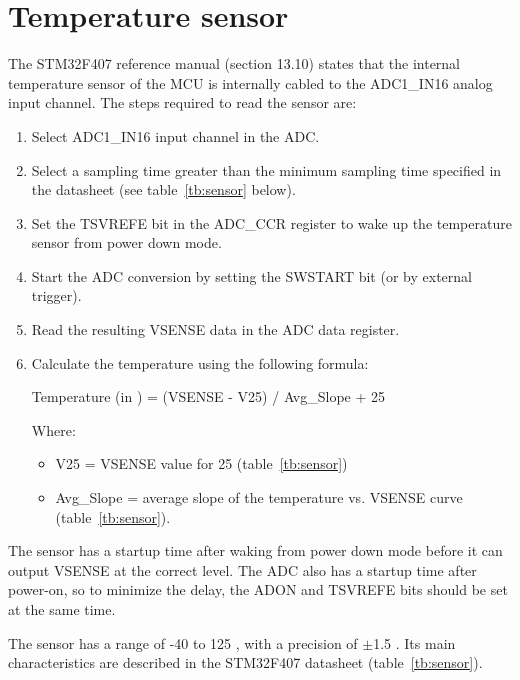 \chapter{Temperature sensor}\label{ap:sensor}

The STM32F407 reference manual (section 13.10) states that the internal temperature sensor of the MCU is internally cabled to the ADC1\_IN16 analog input channel. The steps required to read the sensor are:

\begin{enumerate}
	\item Select ADC1\_IN16 input channel in the ADC.
	\item Select a sampling time greater than the minimum sampling time specified in the datasheet (see table~\ref{tb:sensor} below).
	\item Set the TSVREFE bit in the ADC\_CCR register to wake up the temperature sensor from power down mode.
	\item Start the ADC conversion by setting the SWSTART bit (or by external trigger).
	\item Read the resulting VSENSE data in the ADC data register.
	\item Calculate the temperature using the following formula:
	
	Temperature (in ) = {(VSENSE - V25) / Avg\_Slope} + 25
	
	Where:
	\begin{itemize}
		\item V25 = VSENSE value for 25  (table~\ref{tb:sensor})
		\item Avg\_Slope = average slope of the temperature vs. VSENSE curve (table~\ref{tb:sensor}).
	\end{itemize}
\end{enumerate}

The sensor has a startup time after waking from power down mode before it can output VSENSE at the correct level. The ADC also has a startup time after power-on, so to minimize the delay, the ADON and TSVREFE bits should be set at the same time.

The sensor has a range of -40 to 125 , with a precision of $\pm$1.5 . Its main characteristics are described in the STM32F407 datasheet (table~\ref{tb:sensor}).

